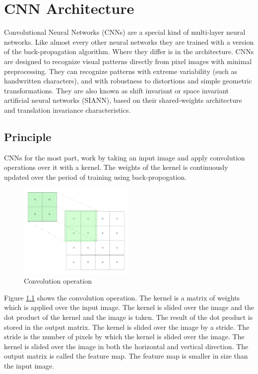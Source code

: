 \chapter{CNN Architecture}

Convolutional Neural Networks (CNNs) are a special kind of multi-layer neural networks. Like almost every other neural networks they are trained with a version of the back-propagation algorithm. Where they differ is in the architecture. CNNs are designed to recognize visual patterns directly from pixel images with minimal preprocessing. They can recognize patterns with extreme variability (such as handwritten characters), and with robustness to distortions and simple geometric transformations. They are also known as shift invariant or space invariant artificial neural networks (SIANN), based on their shared-weights architecture and translation invariance characteristics.

\section{Principle}

CNNs for the most part, work by taking an input image and apply convolution operations over it with a kernel. The weights of the kernel is continuously updated over the period of training using back-propogation.

\begin{figure}
	\centering
	\includegraphics[width=0.5\textwidth]{images/convolution.png}
	\caption{Convolution operation}
	\label{convolution}
\end{figure}

Figure \ref{convolution} shows the convolution operation. The kernel is a matrix of weights which is applied over the input image. The kernel is slided over the image and the dot product of the kernel and the image is taken. The result of the dot product is stored in the output matrix. The kernel is slided over the image by a stride. The stride is the number of pixels by which the kernel is slided over the image. The kernel is slided over the image in both the horizontal and vertical direction. The output matrix is called the feature map. The feature map is smaller in size than the input image.

